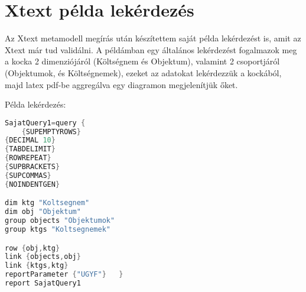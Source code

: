 % 
% 	
% 
% 
% 
% 
% 
% 


\section{Xtext példa lekérdezés}

Az Xtext metamodell megírás után készítettem saját példa lekérdezést is, amit az
Xtext már tud validálni. A példámban egy általános lekérdezést fogalmazok meg a
kocka 2 dimenziójáról (Költségnem és Objektum), valamint 2 csoportjáról
(Objektumok, és Költségnemek), ezeket az adatokat lekérdezzük a kockából, majd
latex pdf-be aggregálva egy diagramon megjelenítjük őket.

Példa lekérdezés:
\begin{lstlisting}[language=java,morekeywords={dim,group,row,link,reportParameter,report,query},alsoletter={-},breaklines=true]
SajatQuery1=query {
	{SUPEMPTYROWS}
{DECIMAL 10}
{TABDELIMIT}
{ROWREPEAT}
{SUPBRACKETS}
{SUPCOMMAS}
{NOINDENTGEN}

dim ktg "Koltsegnem"
dim obj "Objektum"
group objects "Objektumok"
group ktgs "Koltsegnemek"

row {obj,ktg}
link {objects,obj}
link {ktgs,ktg}
reportParameter {"UGYF"}   }
report SajatQuery1
\end{lstlisting}